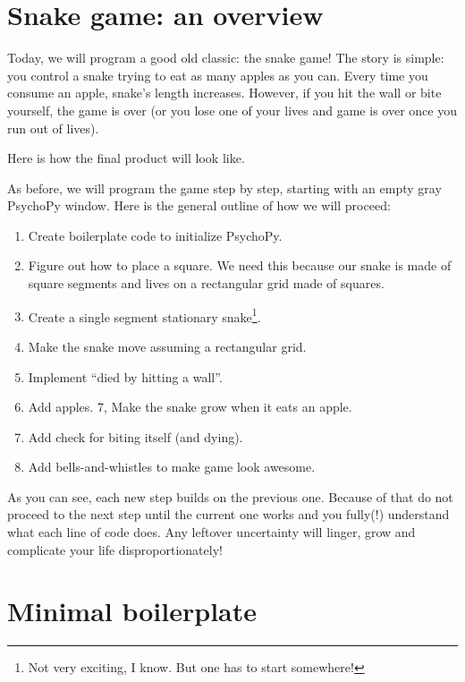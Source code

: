 \documentclass[
]{book}
\providecommand{\tightlist}{%
  \setlength{\itemsep}{0pt}\setlength{\parskip}{0pt}}
\begin{document}
\hypertarget{snake-game-an-overview}{%
\section{Snake game: an overview}\label{snake-game-an-overview}}

Today, we will program a good old classic: the snake game! The story is simple: you control a snake trying to eat as many apples as you can. Every time you consume an apple, snake's length increases. However, if you hit the wall or bite yourself, the game is over (or you lose one of your lives and game is over once you run out of lives).

Here is how the final product will look like.

As before, we will program the game step by step, starting with an empty gray PsychoPy window. Here is the general outline of how we will proceed:

\begin{enumerate}
\def\labelenumi{\arabic{enumi}.}
\tightlist
\item
  Create boilerplate code to initialize PsychoPy.
\item
  Figure out how to place a square. We need this because our snake is made of square segments and lives on a rectangular grid made of squares.
\item
  Create a single segment stationary snake\footnote{Not very exciting, I know. But one has to start somewhere!}.
\item
  Make the snake move assuming a rectangular grid.
\item
  Implement ``died by hitting a wall''.
\item
  Add apples.
  7, Make the snake grow when it eats an apple.
\item
  Add check for biting itself (and dying).
\item
  Add bells-and-whistles to make game look awesome.
\end{enumerate}

As you can see, each new step builds on the previous one. Because of that do not proceed to the next step until the current one works and you fully(!) understand what each line of code does. Any leftover uncertainty will linger, grow and complicate your life disproportionately!

\hypertarget{minimal-boilerplate}{%
\section{Minimal boilerplate}\label{minimal-boilerplate}}
\end{document}
